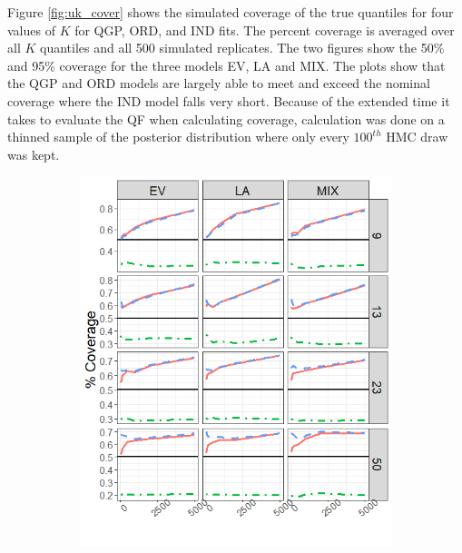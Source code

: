 \documentclass[preprint,12pt,authoryear]{elsarticle}
\begin{document}
Figure \ref{fig:uk_cover} shows the simulated coverage of the true quantiles for four values of $K$ for QGP, ORD, and IND fits. The percent coverage is averaged over all $K$ quantiles and all 500 simulated replicates. The two figures show the 50\% and 95\% coverage for the three models EV, LA and MIX. The plots show that the QGP and ORD models are largely able to meet and exceed the nominal coverage where the IND model falls very short. Because of the extended time it takes to evaluate the QF when calculating coverage, calculation was done on a thinned sample of the posterior distribution where only every $100^{th}$ HMC draw was kept.

\begin{figure}[hbt!]
\begin{subfigure}{.465\linewidth}
  \includegraphics[width=\linewidth]{Images/uk_cover50.png}
\end{subfigure}\hfill %
\begin{subfigure}{.532\linewidth}

\end{subfigure}
\end{figure}
\end{document}
